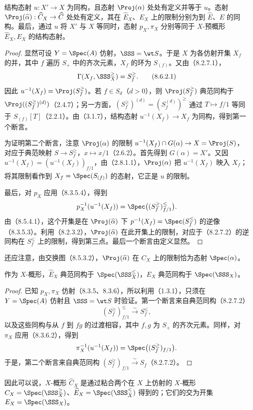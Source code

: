 结构态射 $u:X'\to X$ 为同构，且态射 $\Proj(\alpha)$ 处处有定义并等于 $u$。态射 $\Proj(\widehat\alpha):\widehat C_X\to\widehat C$ 处处有定义，其在 $\widehat E_X$、$E_X$ 上的限制分别为到 $\widehat E$、$E$ 的同构。最后，通过 $u$ 将 $X'$ 与 $X$ 等同时，态射 $p_X,\pi_X$ 分别等同于 $X$-预概形 $\widehat E_X,E_X$ 的结构态射。
\begin{proof}
显然可设 $Y=\Spec(A)$ 仿射，$\SSS=\wt S$。于是 $X$ 为各仿射开集 $X_f$ 的并，其中 $f$ 遍历 $S_+$ 中的齐次元素，$X_f$ 的环为 $S_{(f)}$。又由（8.2.7.1），
\begin{equation}
\Gamma(X_f,\SSS_X^{\geq})=S_f^{\geq}.
\tag{8.6.2.1}
\end{equation}
因此 $u^{-1}(X_f)=\Proj(S_f^{\geq})$。若 $f\in S_d$（$d>0$），则 $\Proj(S_f^{\geq})$ 典范同构于 $\Proj((S_f^{\geq})^{(d)})$（2.4.7）；另一方面，$(S_f^{\geq})^{(d)}=(S_f^{(d)})^{\geq}$ 通过 $T\mapsto f/1$ 等同于 $S_{(f)}[T]$（2.2.1）。由（3.1.7），结构态射 $u^{-1}(X_f)\to X_f$ 为同构，得到第一个断言。

为证明第二个断言，注意 $\Proj(\alpha)$ 的限制 $u^{-1}(X_f)\cap G(\alpha)\to X=\Proj(S)$，对应于典范映射 $S\to S_f^{\geq}$，$x\mapsto x/1$（2.6.2）。首先得到 $G(\alpha)=X'$。又因 $u^{-1}(X_f)=(u^{-1}(X_f))_{f/1}$，由（2.8.1.1），$\Proj(\alpha)$ 把 $u^{-1}(X_f)$ 映入 $X_f$；将其限制看作到 $X_f=\Spec(S_{(f)})$ 的态射，它正是 $u$ 的限制。

最后，对 $p_X$ 应用（8.3.5.4），得到
\[
p_X^{-1}(u^{-1}(X_f))=\Spec\bigl((S_f^{\geq})_{f/1}^{\leq}\bigr).
\]
由（8.5.4.1），这个开集是在 $\Proj(\widehat\alpha)$ 下 $p^{-1}(X_f)=\Spec(S_f^{\leq})$ 的逆像（8.3.5.3）。利用（8.2.3.2），$\Proj(\widehat\alpha)$ 在此开集上的限制，对应于（8.2.7.2）的逆同构在 $S_f^{\leq}$ 上的限制，得到第三点。最后一个断言由定义显然。
\end{proof}
还应注意，由交换图（8.5.3.2），$\Proj(\widehat\alpha)$ 在 $C_X$ 上的限制恰为态射 $\Spec(\alpha)$。

作为 $X$-概形，$\widehat E_X$ 典范同构于 $\Spec(\SSS_X^{\leq})$，$E_X$ 典范同构于 $\Spec(\SSS_X)$。
\begin{proof}
已知 $p_X,\pi_X$ 仿射（8.3.5、8.3.6），所以利用（1.3.1），只须在 $Y=\Spec(A)$ 仿射且 $\SSS=\wt S$ 时验证。第一个断言来自典范同构（8.2.7.2）
\[
(S_f^{\geq})_{f/1}^{\leq}\xrightarrow{\sim}S_f^{\leq},
\]
以及这些同构与从 $f$ 到 $fg$ 的过渡相容，其中 $f,g$ 为 $S_+$ 的齐次元素。同样，对 $\pi_X$ 应用（8.3.6.2），得到
\[
\pi_X^{-1}(u^{-1}(X_f))=\Spec\bigl((S_f^{\geq})_{f/1}\bigr).
\]
于是，第二个断言来自典范同构 $(S_f^{\geq})_{f/1}\xrightarrow{\sim}S_f$（8.2.7.2）。
\end{proof}
因此可以说，$X$-概形 $\widehat C_X$ 是通过粘合两个在 $X$ 上仿射的 $X$-概形 $C_X=\Spec(\SSS_X^{\geq})$、$\widehat E_X=\Spec(\SSS_X^{\leq})$ 得到的；它们的交为开集 $E_X=\Spec(\SSS_X)$。

